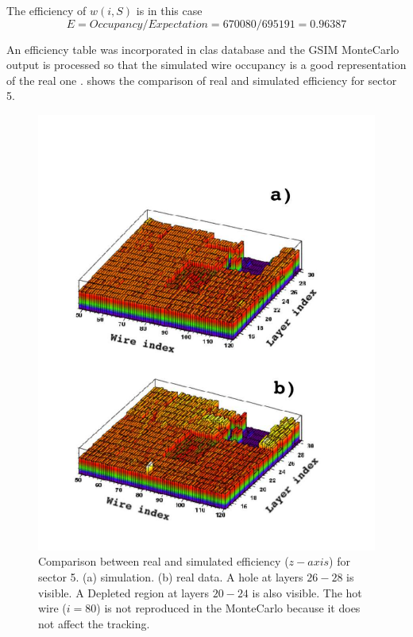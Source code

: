 The efficiency of $w(i,S)$ is in this case
$$
 E = Occupancy/Expectation = 670080 / 695191 = 0.96387 
$$

An efficiency table was incorporated in clas database and the GSIM MonteCarlo output is processed so that
the simulated wire occupancy is a good representation of the real one \cite{bib:wires}.  shows
the comparison of real and simulated efficiency for sector 5.


\begin{figure}[h]
 \begin{center}
 \includegraphics[width = 12cm, bb=0 0 700 720]{acceptance/img/wires_comp} 
  \caption[Comparison between real and simulated efficiency.]
          { Comparison between real and simulated efficiency ($z-axis$) for sector 5. (a) simulation. (b) real data.
	             A hole at layers $26-28$ is visible. A Depleted region at layers $20-24$ is also visible. 
		     The hot wire ($i=80$) is not reproduced in the MonteCarlo because it does not affect the tracking.}
 \label{fig:wires_comp}
 \end{center}
\end{figure} 



























